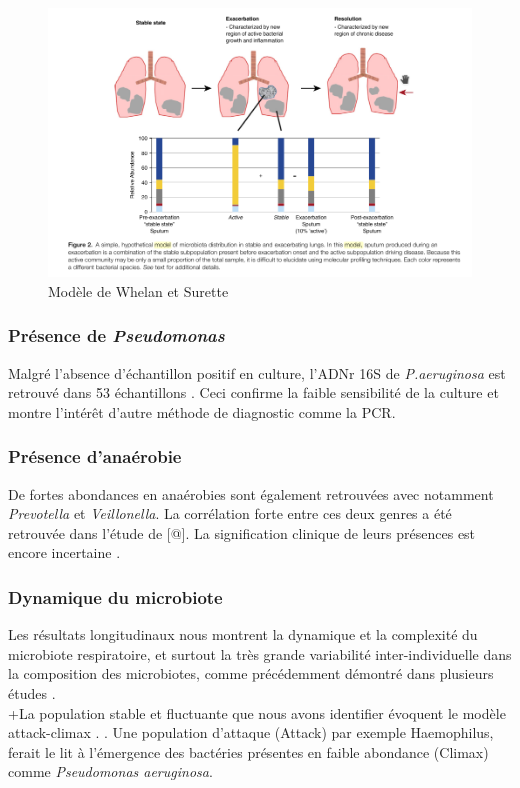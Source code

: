 \documentclass[12pt,a4paper]{article}
\begin{document}
\begin{figure}[h]
\begin{center}
\includegraphics[scale=0.60]{img/lung_region.png}\hfill
\end{center}
\caption{Modèle de Whelan et Surette \cite{Whelan2015}}
\label{lungregion}
\end{figure}

\subsubsection{Présence de \textit{Pseudomonas}}
Malgré l'absence d'échantillon positif en culture, l'ADNr 16S de \textit{P.aeruginosa} est retrouvé dans 53 échantillons . Ceci confirme la faible sensibilité de la culture et montre l’intérêt d’autre méthode de diagnostic comme la PCR\cite{LeGall}.

\subsubsection{Présence d'anaérobie}
De fortes abondances en anaérobies  sont également retrouvées avec notamment \textit{Prevotella} et \textit{Veillonella}. La corrélation forte  entre ces deux genres a été retrouvée dans l’étude de [@]. La signification clinique de leurs présences est encore incertaine \cite{Tunney2008}. 

\subsubsection{Dynamique du microbiote}
Les résultats longitudinaux nous montrent la dynamique et la complexité du microbiote respiratoire, et surtout la très grande variabilité inter-individuelle dans la composition des microbiotes, comme précédemment démontré dans  plusieurs études \cite{Coburn2015}.  \\
 +La population stable et fluctuante que nous avons identifier évoquent le modèle attack-climax \cite{Conrad2013}. . Une population d'attaque (Attack) par exemple Haemophilus, ferait le lit à l'émergence des bactéries présentes en faible abondance (Climax) comme \textit{Pseudomonas aeruginosa}.  
\end{document}
